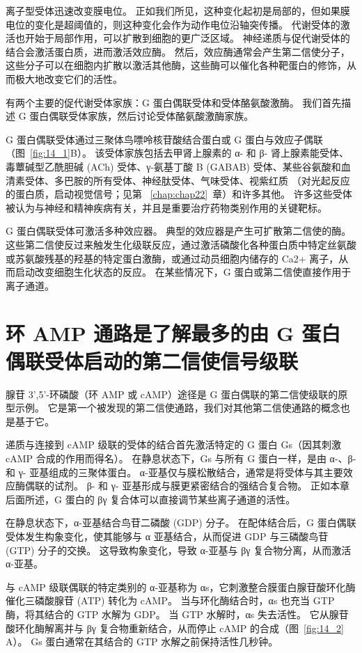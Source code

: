 离子型受体迅速改变膜电位。
正如我们所见，这种变化起初是局部的，但如果膜电位的变化是超阈值的，则这种变化会作为动作电位沿轴突传播。
代谢受体的激活也开始于局部作用，可以扩散到细胞的更广泛区域。
神经递质与促代谢受体的结合会激活蛋白质，进而激活效应酶。
然后，效应酶通常会产生第二信使分子，这些分子可以在细胞内扩散以激活其他酶，这些酶可以催化各种靶蛋白的修饰，从而极大地改变它们的活性。


有两个主要的促代谢受体家族：G 蛋白偶联受体和受体酪氨酸激酶。
我们首先描述 G 蛋白偶联受体家族，然后讨论受体酪氨酸激酶家族。


G 蛋白偶联受体通过三聚体鸟嘌呤核苷酸结合蛋白或 G 蛋白与效应子偶联（图~\ref{fig:14_1}B）。
该受体家族包括去甲肾上腺素的 α- 和 β- 肾上腺素能受体、毒蕈碱型乙酰胆碱 (ACh) 受体、γ-氨基丁酸 B (GABAB) 受体、某些谷氨酸和血清素受体、多巴胺的所有受体、神经肽受体、气味受体、视紫红质 （对光起反应的蛋白质，启动视觉信号；见第 ~\ref{chap:chap22}~章）和许多其他。
许多这些受体被认为与神经和精神疾病有关，并且是重要治疗药物类别作用的关键靶标。


G 蛋白偶联受体可激活多种效应器。
典型的效应器是产生可扩散第二信使的酶。
这些第二信使反过来触发生化级联反应，通过激活磷酸化各种蛋白质中特定丝氨酸或苏氨酸残基的羟基的特定蛋白激酶，或通过动员细胞内储存的 Ca2+ 离子，从而启动改变细胞生化状态的反应。
在某些情况下，G 蛋白或第二信使直接作用于离子通道。



\section{环 AMP 通路是了解最多的由 G 蛋白偶联受体启动的第二信使信号级联}

腺苷 3',5'-环磷酸（环 AMP 或 cAMP）途径是 G 蛋白偶联的第二信使级联的原型示例。
它是第一个被发现的第二信使通路，我们对其他第二信使通路的概念也是基于它。


递质与连接到 cAMP 级联的受体的结合首先激活特定的 G 蛋白 Gs（因其刺激 cAMP 合成的作用而得名）。
在静息状态下，Gs 与所有 G 蛋白一样，是由 α-、β- 和 γ- 亚基组成的三聚体蛋白。
α-亚基仅与膜松散结合，通常是将受体与其主要效应酶偶联的试剂。
β- 和 γ- 亚基形成与膜更紧密结合的强结合复合物。
正如本章后面所述，G 蛋白的 βγ 复合体可以直接调节某些离子通道的活性。


在静息状态下，α-亚基结合鸟苷二磷酸 (GDP) 分子。
在配体结合后，G 蛋白偶联受体发生构象变化，使其能够与 α 亚基结合，从而促进 GDP 与三磷酸鸟苷 (GTP) 分子的交换。
这导致构象变化，导致 α-亚基与 βγ 复合物分离，从而激活 α-亚基。


与 cAMP 级联偶联的特定类别的 α-亚基称为 αs，它刺激整合膜蛋白腺苷酸环化酶催化三磷酸腺苷 (ATP) 转化为 cAMP。
当与环化酶结合时，αs 也充当 GTP 酶，将其结合的 GTP 水解为 GDP。
当 GTP 水解时，αs 失去活性。 它从腺苷酸环化酶解离并与 βγ 复合物重新结合，从而停止 cAMP 的合成（图~\ref{fig:14_2} A）。
Gs 蛋白通常在其结合的 GTP 水解之前保持活性几秒钟。


